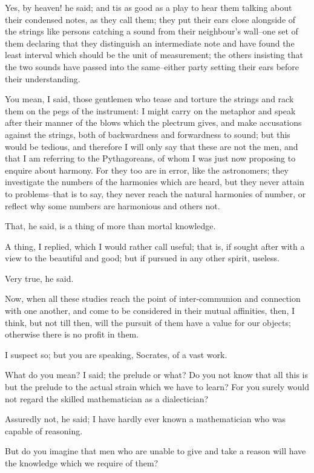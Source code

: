 Yes, by heaven! he said; and tis as good as a play to hear them talking
about their condensed notes, as they call them; they put their ears
close alongside of the strings like persons catching a sound from their
neighbour's wall--one set of them declaring that they distinguish an
intermediate note and have found the least interval which should be
the unit of measurement; the others insisting that the two sounds have
passed into the same--either party setting their ears before their
understanding.

You mean, I said, those gentlemen who tease and torture the strings and
rack them on the pegs of the instrument: I might carry on the metaphor
and speak after their manner of the blows which the plectrum gives,
and make accusations against the strings, both of backwardness and
forwardness to sound; but this would be tedious, and therefore I will
only say that these are not the men, and that I am referring to the
Pythagoreans, of whom I was just now proposing to enquire about harmony.
For they too are in error, like the astronomers; they investigate the
numbers of the harmonies which are heard, but they never attain to
problems--that is to say, they never reach the natural harmonies of
number, or reflect why some numbers are harmonious and others not.

That, he said, is a thing of more than mortal knowledge.

A thing, I replied, which I would rather call useful; that is, if sought
after with a view to the beautiful and good; but if pursued in any other
spirit, useless.

Very true, he said.

Now, when all these studies reach the point of inter-communion and
connection with one another, and come to be considered in their mutual
affinities, then, I think, but not till then, will the pursuit of them
have a value for our objects; otherwise there is no profit in them.

I suspect so; but you are speaking, Socrates, of a vast work.

What do you mean? I said; the prelude or what? Do you not know that all
this is but the prelude to the actual strain which we have to learn? For
you surely would not regard the skilled mathematician as a dialectician?

Assuredly not, he said; I have hardly ever known a mathematician who was
capable of reasoning.

But do you imagine that men who are unable to give and take a reason
will have the knowledge which we require of them?

